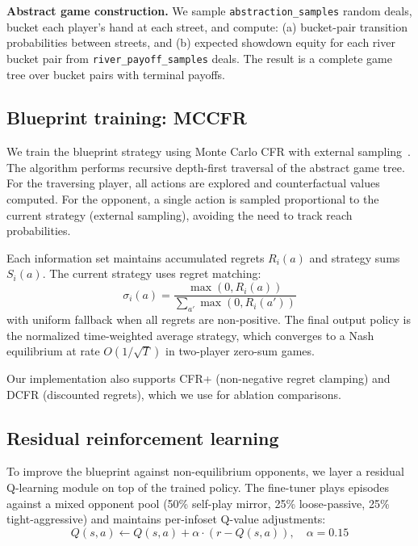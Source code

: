 \documentclass{article}
\begin{document}
\textbf{Abstract game construction.} We sample \texttt{abstraction\_samples} random deals, bucket each player's hand at each street, and compute: (a) bucket-pair transition probabilities between streets, and (b) expected showdown equity for each river bucket pair from \texttt{river\_payoff\_samples} deals. The result is a complete game tree over bucket pairs with terminal payoffs.

\subsection{Blueprint training: MCCFR}

We train the blueprint strategy using Monte Carlo CFR with external sampling~\cite{lanctot2009monte}. The algorithm performs recursive depth-first traversal of the abstract game tree. For the traversing player, all actions are explored and counterfactual values computed. For the opponent, a single action is sampled proportional to the current strategy (external sampling), avoiding the need to track reach probabilities.

Each information set maintains accumulated regrets $R_i(a)$ and strategy sums $S_i(a)$. The current strategy uses regret matching:
\begin{equation}
    \sigma_i(a) = \frac{\max(0, R_i(a))}{\sum_{a'} \max(0, R_i(a'))}
\end{equation}
with uniform fallback when all regrets are non-positive. The final output policy is the normalized time-weighted average strategy, which converges to a Nash equilibrium at rate $O(1/\sqrt{T})$ in two-player zero-sum games.

Our implementation also supports CFR+ (non-negative regret clamping) and DCFR (discounted regrets), which we use for ablation comparisons.

\subsection{Residual reinforcement learning}

To improve the blueprint against non-equilibrium opponents, we layer a residual Q-learning module on top of the trained policy. The fine-tuner plays episodes against a mixed opponent pool (50\% self-play mirror, 25\% loose-passive, 25\% tight-aggressive) and maintains per-infoset Q-value adjustments:
\begin{equation}
    Q(s,a) \leftarrow Q(s,a) + \alpha \cdot (r - Q(s,a)), \quad \alpha = 0.15
\end{equation}
\end{document}
